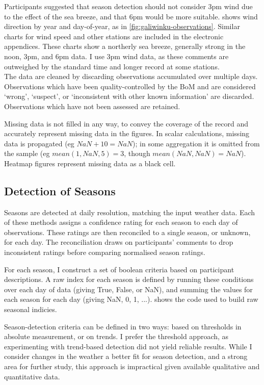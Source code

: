 Participants suggested that season detection should not consider 3pm wind
due to the effect of the sea breeze, and that 6pm would be more suitable.
 shows wind direction by year
and day-of-year, as in \cref{fig:galiwinku-observations}.
%
Similar charts for wind speed and other stations are included in the electronic
appendices.  These charts show a northerly sea breeze, generally strong in the
noon, 3pm, and 6pm data.  I use 3pm wind data, as these comments are outweighed
by the standard time and longer record at some stations.\\

The data are cleaned by discarding observations accumulated over multiple days.
Observations which have been quality-controlled by the BoM and are considered
`wrong', `suspect', or `inconsistent with other known information' are discarded.
Observations which have not been assessed are retained.

Missing data is not filled in any way, to convey the coverage of the record
and accurately represent missing data in the figures.  In scalar calculations,
missing data is propagated (eg ${NaN+10=NaN}$); in some aggregation
it is omitted from the sample (eg ${mean(1,NaN,5)=3}$, though
${mean(NaN,NaN)=NaN}$). Heatmap figures represent missing data as a black cell.


\subsection{Detection of Seasons}

Seasons are detected at daily resolution, matching the input
weather data.
Each of these methods assigns a confidence rating for each season to each day of
observations.  These ratings are then reconciled to a single season, or unknown,
for each day.  The reconciliation draws on participants' comments to drop inconsistent
ratings before comparing normalised season ratings.

For each season, I construct a set of boolean criteria based on participant
descriptions.  A raw index for each season is defined by
running these conditions over each day of data (giving True, False, or NaN),
and summing the values for each season for each day (giving NaN, 0, 1, ...).
 shows the code used to build raw
seasonal indicies.

Season-detection criteria can be defined in two ways: based on thresholds
in absolute measurement, or on trends.  I prefer the threshold approach,
as experimenting with trend-based detection did not yield reliable results.
While I consider changes in the weather a better fit for season detection,
and a strong area for further study, this approach is impractical given available
qualitative and quantitative data.

